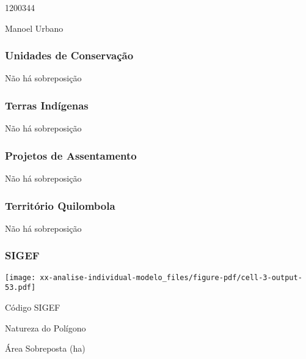 \documentclass[
  11pt,
  a4paper,
  DIV=11,
  numbers=noendperiod]{scrartcl}
\begin{document}
1200344

\n      

Manoel Urbano

\n    

\n  

\n

\subsubsection{Unidades de
Conservação}\label{unidades-de-conservauxe7uxe3o-2}

Não há sobreposição

\subsubsection{Terras Indígenas}\label{terras-induxedgenas-2}

Não há sobreposição

\subsubsection{Projetos de
Assentamento}\label{projetos-de-assentamento-2}

Não há sobreposição

\subsubsection{Território Quilombola}\label{territuxf3rio-quilombola-2}

Não há sobreposição

\subsubsection{SIGEF}\label{sigef-2}

\texttt{[image: xx-analise-individual-modelo\_files/figure-pdf/cell-3-output-53.pdf]}

\n  

\n    

\n      

Código SIGEF

\n      

Natureza do Polígono

\n      

Área Sobreposta (ha)

\n    

\n  

\n  

\n    
\end{document}
